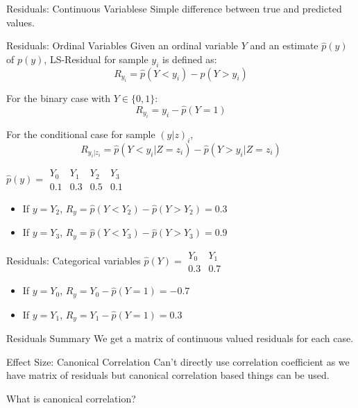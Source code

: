 \documentclass{beamer}
\begin{document}
\begin{frame}{Residuals: Continuous Variablese}
	Simple difference between true and predicted values.
\end{frame}

\begin{frame}{Residuals: Ordinal Variables}
	Given an ordinal variable $ Y $ and an estimate $ \hat{p}(y) $ of $
	p(y) $, LS-Residual for sample $ y_i $ is defined as:
	$$ R_{y_i} = \hat{p}(Y < y_i) - \hat{p}(Y > y_i) $$
	\vspace{1em}

	For the binary case with $ Y \in \{0, 1\} $:
	$$ R_{y_i} = y_i - \hat{p}(Y = 1) $$
	\vspace{1em}

	For the conditional case for sample $ (y|z)_i $,
	$$ R_{y_i | z_i} = \hat{p}(Y < y_i | Z=z_i) - \hat{p}(Y>y_i|Z=z_i) $$

	$ \hat{p}(y) = \begin{array}{llll} Y_0 & Y_1 & Y_2 & Y_3 \\ 0.1 & 0.3 & 0.5 & 0.1 \end{array} $
	\begin{itemize}
		\item If $ y = Y_2 $, $ R_{y} = \hat{p}(Y < Y_2) - \hat{p}(Y > Y_2) = 0.3 $
		\item If $ y = Y_3 $, $ R_{y} = \hat{p}(Y < Y_3) - \hat{p}(Y > Y_3) = 0.9 $
	\end{itemize}
\end{frame}

\begin{frame}{Residuals: Categorical variables}
	$\hat{p}(Y) = \begin{array}{ll} Y_0 & Y_1 \\ 0.3 & 0.7 \end{array} $
	\begin{itemize}	
		\item If $ y = Y_0 $, $ R_{y} = Y_0 - \hat{p}(Y=1) = -0.7 $
		\item If $ y = Y_1 $, $ R_{y} = Y_1 - \hat{p}(Y=1) = 0.3 $
	\end{itemize}
\end{frame}

\begin{frame}{Residuals Summary}
	We get a matrix of continuous valued residuals for each case.
\end{frame}

\begin{frame}{Effect Size: Canonical Correlation}
	Can't directly use correlation coefficient as we have matrix of
	residuals but canonical correlation based things can be used.

	What is canonical correlation?
\end{frame}
\end{document}
